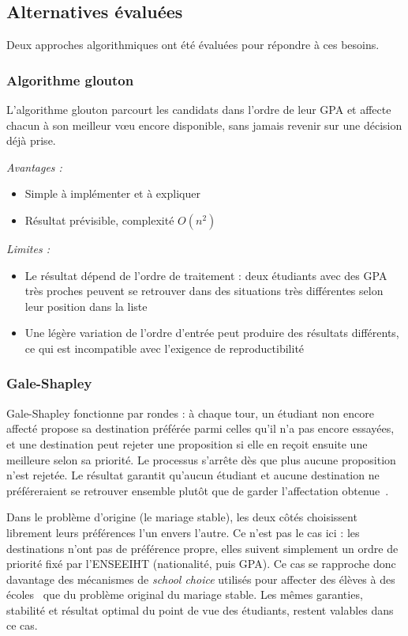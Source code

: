 \subsection{Alternatives évaluées}

Deux approches algorithmiques ont été évaluées pour répondre à ces besoins.

\subsubsection{Algorithme glouton}

L'algorithme glouton parcourt les candidats dans l'ordre de leur GPA
et affecte chacun à son meilleur vœu encore disponible, sans jamais
revenir sur une décision déjà prise.

\textit{Avantages :}
\begin{itemize}
  \item Simple à implémenter et à expliquer
  \item Résultat prévisible, complexité $O(n^2)$
\end{itemize}

\textit{Limites :}
\begin{itemize}
  \item Le résultat dépend de l'ordre de traitement : deux étudiants
        avec des GPA très proches peuvent se retrouver dans des
        situations très différentes selon leur position dans la liste
  \item Une légère variation de l'ordre d'entrée peut produire des
        résultats différents, ce qui est incompatible avec l'exigence
        de reproductibilité
\end{itemize}

\subsubsection{Gale-Shapley}

Gale-Shapley fonctionne par rondes : à chaque tour, un étudiant non encore affecté propose sa destination préférée parmi celles qu'il n'a pas encore essayées, et une destination peut rejeter une proposition si elle en reçoit ensuite une meilleure selon sa priorité. Le processus s'arrête dès que plus aucune proposition n'est rejetée. Le résultat garantit qu'aucun étudiant et aucune destination ne préféreraient se retrouver ensemble plutôt que de garder l'affectation obtenue~\cite{GaleShapley1962}.

Dans le problème d'origine (le mariage stable), les deux côtés choisissent librement leurs préférences l'un envers l'autre. Ce n'est pas le cas ici : les destinations n'ont pas de préférence propre, elles suivent simplement un ordre de priorité fixé par l'ENSEEIHT (nationalité, puis GPA). Ce cas se rapproche donc davantage des mécanismes de \textit{school choice} utilisés pour affecter des élèves à des écoles~\cite{AbdulkadirogluSonmez2003} que du problème original du mariage stable. Les mêmes garanties, stabilité et résultat optimal du point de vue des étudiants, restent valables dans ce cas.

